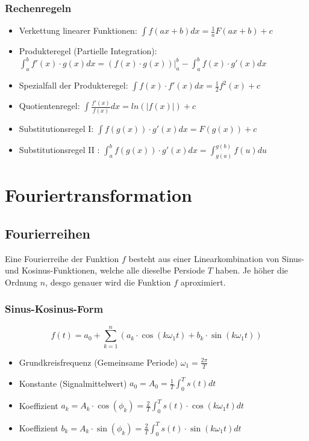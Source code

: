 \subsubsection{Rechenregeln}
\begin{itemize}
  \item Verkettung linearer Funktionen: $\int f(ax+b)dx = \frac{1}{a}F(ax+b) + c$
  \item Produkteregel (Partielle Integration): $\int_a^b f'(x) \cdot g(x) dx =
    (f(x) \cdot g(x))|^b_a - \int_a^b f(x) \cdot g'(x) dx$
  \item Spezialfall der Produkteregel: $\int f(x) \cdot f'(x) dx = \frac{1}{2}f^2(x) + c$
  \item Quotientenregel: $\int \frac{f'(x)}{f(x)}dx = ln(|f(x)|) + c$
  \item Substitutionsregel I: $ \int f(g(x)) \cdot g'(x) dx = F(g(x)) + c$
  \item Substitutionsregel II : $ \int_a^b f(g(x)) \cdot g'(x) dx =
    \int_{g(a)}^{g(b)} f(u) du$
\end{itemize}


\section{Fouriertransformation}
\subsection{Fourierreihen}
Eine Fourierreihe der Funktion $f$ besteht aus einer Linearkombination
von Sinus- und Kosinus-Funktionen, welche alle dieselbe Persiode $T$
haben. Je höher die Ordnung $n$, desgo genauer wird die Funktion $f$ aproximiert.

\subsubsection{Sinus-Kosinus-Form}
\[
  f(t) = a_0 + \sum_{k=1}^{n}
  (a_k \cdot \cos(k \omega_1 t) + b_k \cdot \sin(k \omega_1 t))
\]
\begin{itemize}
  \item Grundkreisfrequenz (Gemeinsame Periode) $\omega_1 = \frac{2\pi}{T}$
  \item Konstante (Signalmittelwert) $a_0 = A_0 = \frac{1}{T}\int_0^T s(t) dt$
  \item Koeffizient $a_k = A_k \cdot \cos(\phi_k) =
    \frac{2}{T} \int_0^T s(t) \cdot \cos(k \omega_1 t) dt$
  \item Koeffizient $b_k = A_k \cdot \sin(\phi_k) =
    \frac{2}{T} \int_0^T s(t) \cdot \sin(k \omega_1 t) dt$
\end{itemize}

